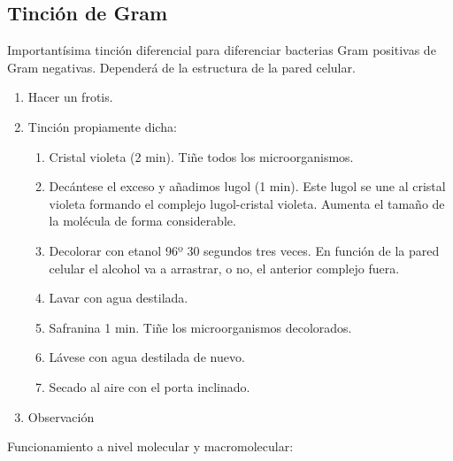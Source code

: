 \subsection{Tinción de Gram}
Importantísima tinción diferencial para diferenciar bacterias Gram positivas de Gram negativas. Dependerá de la estructura de la pared celular.
\begin{enumerate}[itemsep=0pt,parsep=0pt,topsep=0pt,partopsep=0pt]
	\item Hacer un frotis.
	\item Tinción propiamente dicha:
	\begin{enumerate}[itemsep=0pt,parsep=0pt,topsep=0pt,partopsep=0pt]
		\item Cristal violeta (2 min). Tiñe todos los microorganismos.
		\item Decántese el exceso y añadimos lugol (1 min). Este lugol se une al cristal violeta formando el complejo lugol-cristal violeta. Aumenta el tamaño de la molécula de forma considerable.
		\item Decolorar con etanol 96º 30 segundos tres veces. En función de la pared celular el alcohol va a arrastrar, o no, el anterior complejo fuera. 
		\item Lavar con agua destilada.
		\item Safranina 1 min. Tiñe los microorganismos decolorados.
		\item Lávese con agua destilada de nuevo.
		\item Secado al aire con el porta inclinado.
	\end{enumerate}
	\item Observación
\end{enumerate}
Funcionamiento a nivel molecular y macromolecular:
